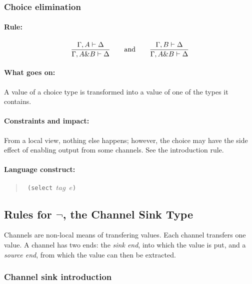 \documentclass[a4paper]{article}
\begin{document}
\subsubsection{Choice elimination}


\paragraph{Rule:}
$$
{{
  \Gamma, A \vdash \Delta
}\over{
  \Gamma, A \& B \vdash \Delta
}}
\qquad \textrm{and} \qquad
{{
  \Gamma, B \vdash \Delta
}\over{
  \Gamma, A \& B \vdash \Delta
}}
$$

\paragraph{What goes on:} A value of a choice type is transformed into
a value of one of the types it contains.

\paragraph{Constraints and impact:}
From a local view, nothing else happens;
however, the choice may have the side effect of enabling output from
some channels. See the introduction rule.

\paragraph{Language construct:}
\begin{quote}\tt
(select $\mathit{tag}$ $e$)
\end{quote}


\subsection{Rules for $\lnot$, the Channel Sink Type}

Channels are non-local means of transfering values.
Each channel transfers one value.
A channel has two ends: the \emph{sink end}, into which the value is
put, and a \emph{source end}, from which the value can then be
extracted.

\subsubsection{Channel sink introduction}
\end{document}
